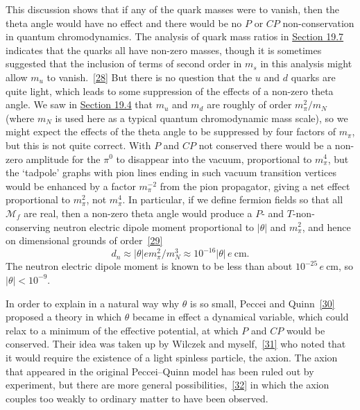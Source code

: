 This discussion shows that if any of the quark masses were to vanish,
then the theta angle would have no effect and there would be no $P$ or
$CP$ non-conservation in quantum chromodynamics. The analysis of quark
mass ratios in \hyperref[sec:19.7]{Section 19.7} indicates that the quarks
all have non-zero masses, though it is sometimes suggested that the
inclusion of terms of second order in $m_s$ in this analysis might allow
$m_u$ to vanish.~\hyperref[ch23-ref-28]{[28]} But there is no question
that the $u$ and $d$ quarks are quite light, which leads to some
suppression of the effects of a non-zero theta angle. We saw in
\hyperref[sec:19.4]{Section 19.4} that $m_u$ and $m_d$ are roughly of
order $m_\pi^2/m_N$ (where $m_N$ is used here as a typical quantum
chromodynamic mass scale), so we might expect the effects of the theta
angle to be suppressed by four factors of $m_\pi$, but this is not quite
correct. With $P$ and $CP$ not conserved there would be a non-zero
amplitude for the $\pi^0$ to disappear into the vacuum, proportional to
$m_\pi^4$, but the `tadpole' graphs with pion lines ending in such vacuum
transition vertices would be enhanced by a factor $m_\pi^{-2}$ from the
pion propagator, giving a net effect proportional to $m_\pi^2$, not
$m_\pi^4$. In particular, if we define fermion fields so that all
$\mathcal M_f$ are real, then a non-zero theta angle would produce a
$P$- and $T$-non-conserving neutron electric dipole moment proportional
to $|\theta|$ and $m_\pi^2$, and hence on dimensional grounds of
order~\hyperref[ch23-ref-29]{[29]}
\begin{equation}
d_n\approx|\theta|e m_\pi^2/m_N^3
\approx10^{-16}|\theta|\,e\ \mathrm{cm}.
\tag{23.6.13}\label{eq:23.6.13}
\end{equation}
The neutron electric dipole moment is known to be less than about
$10^{-25}\,e\ \mathrm{cm}$, so $|\theta|<10^{-9}$.

In order to explain in a natural way why $\theta$ is so small, Peccei and
Quinn~\hyperref[ch23-ref-30]{[30]} proposed a theory in which $\theta$
became in effect a dynamical variable, which could relax to a minimum of
the effective potential, at which $P$ and $CP$ would be conserved. Their
idea was taken up by Wilczek and myself,~\hyperref[ch23-ref-31]{[31]} who
noted that it would require the existence of a light spinless particle,
the axion. The axion that appeared in the original Peccei--Quinn model
has been ruled out by experiment, but there are more general
possibilities,~\hyperref[ch23-ref-32]{[32]} in which the axion couples too
weakly to ordinary matter to have been observed.


